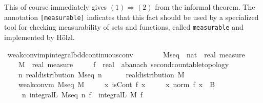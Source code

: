 \documentclass[leqno]{article}
\theoremstyle{definition}
\begin{document}
\medskip

This of course immediately gives $(1) \Longrightarrow (2)$ from the informal theorem. The annotation \texttt{[measurable]} indicates that this fact should be used by a specialized tool for checking measurability of sets and functions, called \texttt{measurable} and implemented by H\"olzl. 

\medskip

\begin{isabellebody}
\isamarkupfalse%
\ weak{\isacharunderscore}conv{\isacharunderscore}imp{\isacharunderscore}integral{\isacharunderscore}bdd{\isacharunderscore}continuous{\isacharunderscore}conv{\isacharcolon}\isanewline
\ \ \ \isanewline
\ \ \ \ M{\isacharunderscore}seq\ {\isacharcolon}{\isacharcolon}\ {\isachardoublequoteopen}nat\ {\isasymRightarrow}\ real\ measure{\isachardoublequoteclose}\ \isanewline
\ \ \ \ M\ {\isacharcolon}{\isacharcolon}\ {\isachardoublequoteopen}real\ measure{\isachardoublequoteclose}\ \isanewline
\ \ \ \ f\ {\isacharcolon}{\isacharcolon}\ {\isachardoublequoteopen}real\ {\isasymRightarrow}\ {\isacharprime}a{\isacharcolon}{\isacharcolon}{\isacharbraceleft}banach{\isacharcomma}\ second{\isacharunderscore}countable{\isacharunderscore}topology{\isacharbraceright}{\isachardoublequoteclose}\isanewline
\ \ \ \isanewline
\ \ \ \ {\isachardoublequoteopen}{\isasymAnd}n{\isachardot}\ real{\isacharunderscore}distribution\ {\isacharparenleft}M{\isacharunderscore}seq\ n{\isacharparenright}{\isachardoublequoteclose}\ \ \isanewline
\ \ \ \ {\isachardoublequoteopen}real{\isacharunderscore}distribution\ M{\isachardoublequoteclose}\ \ \isanewline
\ \ \ \ {\isachardoublequoteopen}weak{\isacharunderscore}conv{\isacharunderscore}m\ M{\isacharunderscore}seq\ M{\isachardoublequoteclose}\ \isanewline
\ \ \ \ {\isachardoublequoteopen}{\isasymAnd}x{\isachardot}\ isCont\ f\ x{\isachardoublequoteclose}\ \isanewline
\ \ \ \ {\isachardoublequoteopen}{\isasymAnd}x{\isachardot}\ norm\ {\isacharparenleft}f\ x{\isacharparenright}\ {\isasymle}\ B{\isachardoublequoteclose}\isanewline
\ \ \ \isanewline
\ \ \ \ {\isachardoublequoteopen}{\isacharparenleft}{\isasymlambda}\ n{\isachardot}\ integral\isactrlsup L\ {\isacharparenleft}M{\isacharunderscore}seq\ n{\isacharparenright}\ f{\isacharparenright}\ {\isacharminus}{\isacharminus}{\isacharminus}{\isacharminus}{\isachargreater}\ integral\isactrlsup L\ M\ f{\isachardoublequoteclose}\isanewline

\end{isabellebody}
\end{document}
